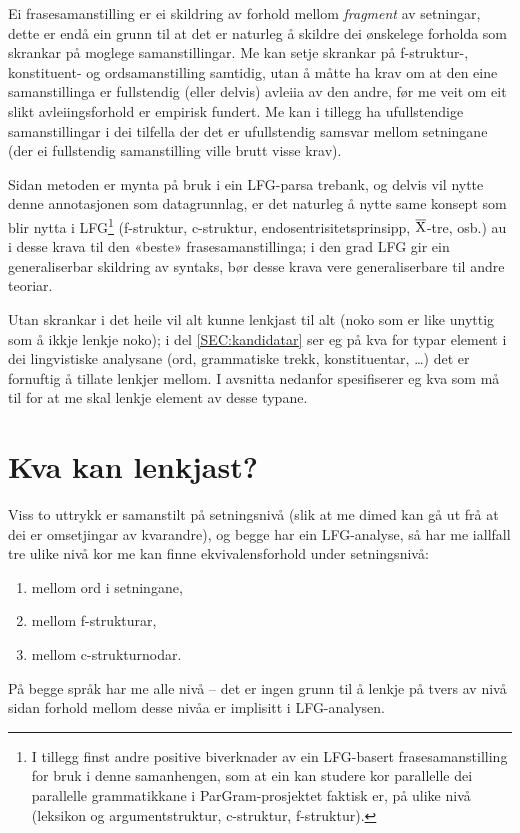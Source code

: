 \documentclass[11pt,a4paper,oneside,draft]{book}
\newcommand{\xbar}{$\rm\overline{X}$}
\begin{document}
Ei frasesamanstilling er ei skildring av forhold mellom \emph{fragment} av
setningar, dette er endå ein grunn til at det er naturleg å skildre
dei ønskelege forholda som skrankar på moglege samanstillingar. Me kan
setje skrankar på f-struktur-, konstituent- og ordsamanstilling
samtidig, utan å måtte ha krav om at den eine samanstillinga er
fullstendig (eller delvis) avleiia av den andre, før me veit om eit
slikt avleiingsforhold er empirisk fundert. Me kan i tillegg ha
ufullstendige samanstillingar i dei tilfella der det er ufullstendig
samsvar mellom setningane (der ei fullstendig samanstilling ville
brutt visse krav).

Sidan metoden er mynta på bruk i ein LFG-parsa trebank, og delvis vil
nytte denne annotasjonen som datagrunnlag, er det naturleg å nytte
same konsept som blir nytta i LFG\footnote{I tillegg finst andre positive biverknader av ein LFG-basert
 frasesamanstilling for bruk i denne samanhengen, som at ein kan
 studere kor parallelle dei parallelle grammatikkane i
 ParGram-prosjektet \citep{butt2002pgp} faktisk er, på ulike nivå
 (leksikon og argumentstruktur, c-struktur, f-struktur). } (f-struktur, c-struktur,
endosentrisitetsprinsipp, \xbar{}-tre, osb.)  au i desse krava til den
«beste» frasesamanstillinga; i den grad LFG gir ein generaliserbar
skildring av syntaks, bør desse krava vere generaliserbare til andre
teoriar.

Utan skrankar i det heile vil alt kunne lenkjast til alt (noko som er
like unyttig som å ikkje lenkje noko); i del \ref{SEC:kandidatar} ser
eg på kva for typar element i dei lingvistiske analysane (ord,
grammatiske trekk, konstituentar, \ldots{}) det er fornuftig å tillate
lenkjer mellom. I avsnitta nedanfor spesifiserer eg kva som må til for
at me skal lenkje element av desse typane.

\section{Kva kan lenkjast?}
\label{sec-3.4}

\label{SEC:kandidatar}

Viss to uttrykk er samanstilt på setningsnivå (slik at me dimed kan gå
ut frå at dei er omsetjingar av kvarandre), og begge har ein
LFG-analyse, så har me iallfall tre ulike nivå kor me kan finne
ekvivalensforhold under setningsnivå:
\begin{enumerate}
\item mellom ord i setningane,
\item mellom f-strukturar,
\item mellom c-strukturnodar.
\end{enumerate}
På begge språk har me alle nivå -- det er ingen grunn til å lenkje på
tvers av nivå sidan forhold mellom desse nivåa er implisitt i
LFG-analysen.
\end{document}
